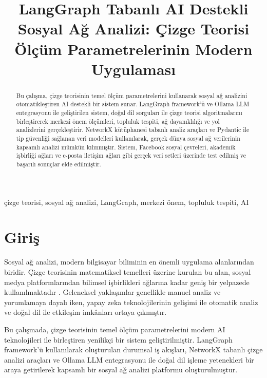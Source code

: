 \documentclass[conference]{IEEEtran}
\begin{document}
\title{LangGraph Tabanlı AI Destekli Sosyal Ağ Analizi: Çizge Teorisi Ölçüm Parametrelerinin Modern Uygulaması}

\author{
}

\maketitle

\begin{abstract}
Bu çalışma, çizge teorisinin temel ölçüm parametrelerini kullanarak sosyal ağ analizini otomatikleştiren AI destekli bir sistem sunar. LangGraph framework'ü ve Ollama LLM entegrasyonu ile geliştirilen sistem, doğal dil sorguları ile çizge teorisi algoritmalarını birleştirerek merkezi önem ölçümleri, topluluk tespiti, ağ dayanıklılığı ve yol analizlerini gerçekleştirir. NetworkX kütüphanesi tabanlı analiz araçları ve Pydantic ile tip güvenliği sağlanan veri modelleri kullanılarak, gerçek dünya sosyal ağ verilerinin kapsamlı analizi mümkün kılınmıştır. Sistem, Facebook sosyal çevreleri, akademik işbirliği ağları ve e-posta iletişim ağları gibi gerçek veri setleri üzerinde test edilmiş ve başarılı sonuçlar elde edilmiştir.
\end{abstract}

\begin{IEEEkeywords}
çizge teorisi, sosyal ağ analizi, LangGraph, merkezi önem, topluluk tespiti, AI
\end{IEEEkeywords}

\section{Giriş}

Sosyal ağ analizi, modern bilgisayar biliminin en önemli uygulama alanlarından biridir. Çizge teorisinin matematiksel temelleri üzerine kurulan bu alan, sosyal medya platformlarından bilimsel işbirlikleri ağlarına kadar geniş bir yelpazede kullanılmaktadır \cite{newman2010networks}. Geleneksel yaklaşımlar genellikle manuel analiz ve yorumlamaya dayalı iken, yapay zeka teknolojilerinin gelişimi ile otomatik analiz ve doğal dil ile etkileşim imkânları ortaya çıkmıştır.

Bu çalışmada, çizge teorisinin temel ölçüm parametrelerini modern AI teknolojileri ile birleştiren yenilikçi bir sistem geliştirilmiştir. LangGraph framework'ü kullanılarak oluşturulan durumsal iş akışları, NetworkX tabanlı çizge analizi araçları ve Ollama LLM entegrasyonu ile doğal dil işleme yetenekleri bir araya getirilerek kapsamlı bir sosyal ağ analizi platformu oluşturulmuştur.
\end{document}
